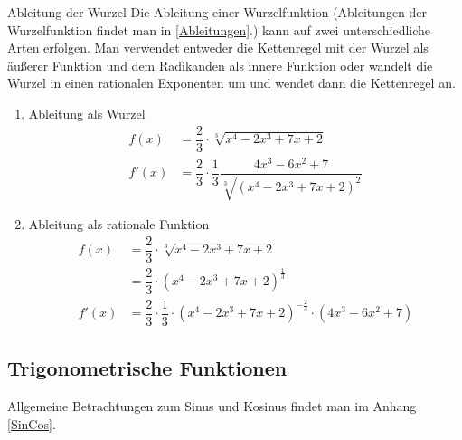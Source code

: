  \begin{bem}{Ableitung der Wurzel}{}
Die Ableitung einer Wurzelfunktion (Ableitungen der Wurzelfunktion findet man in \ref{Ableitungen}.) kann auf zwei unterschiedliche Arten erfolgen. Man verwendet entweder die Kettenregel mit der Wurzel als äußerer Funktion und dem Radikanden als innere Funktion oder wandelt die Wurzel in einen rationalen Exponenten um und wendet dann die Kettenregel an.
\begin{enumerate}
    \item Ableitung als Wurzel
    \begin{equation*}
        \begin{split}
            f(x) &= \dfrac{2}{3} \cdot \sqrt[3]{x^4-2x^3 +7x+2}\\
            f'(x) &= \dfrac{2}{3} \cdot \dfrac{1}{3} \dfrac{4x^3-6x^2+7}{\sqrt[3]{(x^4-2x^3 +7x+2)^2}} 
        \end{split}
    \end{equation*}
    \item Ableitung als rationale Funktion
    \begin{equation*}
        \begin{split}
            f(x) &= \dfrac{2}{3} \cdot \sqrt[3]{x^4-2x^3 +7x+2}\\
            &= \dfrac{2}{3} \cdot (x^4-2x^3+7x+2)^{\frac{1}{3}}\\
            f'(x) &= \dfrac{2}{3} \cdot \dfrac{1}{3} \cdot (x^4-2x^3+7x+2)^{-\frac{2}{3}} \cdot (4x^3-6x^2+7)
        \end{split}
    \end{equation*}
\end{enumerate}
 \end{bem}
 \subsection{Trigonometrische Funktionen}
Allgemeine Betrachtungen zum Sinus und Kosinus findet man im Anhang \ref{SinCos}. 
 
